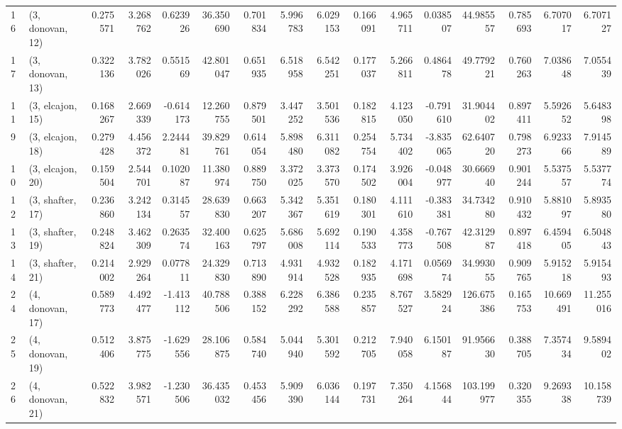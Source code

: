 \begin{tabular}{llrrrrrrrrrrrrrr}
16 &  (3, donovan, 12) &   0.275571 &  3.268762 &  0.623926 &   36.350690 &  0.701834 &   5.996783 &   6.029153 &  0.166091 &  4.965711 &  0.038507 &   44.985557 &  0.785693 &   6.707017 &   6.707127 \\
17 &  (3, donovan, 13) &   0.322136 &  3.782026 &  0.551569 &   42.801047 &  0.651935 &   6.518958 &   6.542251 &  0.177037 &  5.266811 &  0.486478 &   49.779221 &  0.760263 &   7.038648 &   7.055439 \\
11 &  (3, elcajon, 15) &   0.168267 &  2.669339 & -0.614173 &   12.260755 &  0.879501 &   3.447252 &   3.501536 &  0.182815 &  4.123050 & -0.791610 &   31.904402 &  0.897411 &   5.592652 &   5.648398 \\
9  &  (3, elcajon, 18) &   0.279428 &  4.456372 &  2.244481 &   39.829761 &  0.614054 &   5.898480 &   6.311082 &  0.254754 &  5.734402 & -3.835065 &   62.640720 &  0.798273 &   6.923366 &   7.914589 \\
10 &  (3, elcajon, 20) &   0.159504 &  2.544701 &  0.102087 &   11.380974 &  0.889750 &   3.372025 &   3.373570 &  0.174502 &  3.926004 & -0.048977 &   30.666940 &  0.901244 &   5.537557 &   5.537774 \\
12 &  (3, shafter, 17) &   0.236860 &  3.242134 &  0.314557 &   28.639830 &  0.663207 &   5.342367 &   5.351619 &  0.180301 &  4.111610 & -0.383381 &   34.734280 &  0.910432 &   5.881097 &   5.893580 \\
13 &  (3, shafter, 19) &   0.248824 &  3.462309 &  0.263574 &   32.400163 &  0.625797 &   5.686008 &   5.692114 &  0.190533 &  4.358773 & -0.767508 &   42.312987 &  0.897418 &   6.459405 &   6.504843 \\
14 &  (3, shafter, 21) &   0.214002 &  2.929264 &  0.077811 &   24.329830 &  0.713890 &   4.931914 &   4.932528 &  0.182935 &  4.171698 &  0.056974 &   34.993055 &  0.909765 &   5.915218 &   5.915493 \\
24 &  (4, donovan, 17) &   0.589773 &  4.492477 & -1.413112 &   40.788506 &  0.388152 &   6.228292 &   6.386588 &  0.235857 &  8.767527 &  3.582924 &  126.675386 &  0.165753 &  10.669491 &  11.255016 \\
25 &  (4, donovan, 19) &   0.512406 &  3.875775 & -1.629556 &   28.106875 &  0.584740 &   5.044940 &   5.301592 &  0.212705 &  7.940058 &  6.150187 &   91.956630 &  0.388705 &   7.357434 &   9.589402 \\
26 &  (4, donovan, 21) &   0.522832 &  3.982571 & -1.230506 &   36.435032 &  0.453456 &   5.909390 &   6.036144 &  0.197731 &  7.350264 &  4.156844 &  103.199977 &  0.320355 &   9.269338 &  10.158739 \\

\end{tabular}
